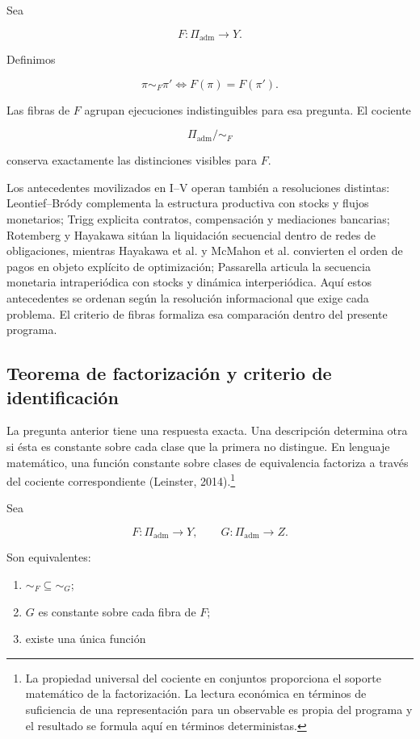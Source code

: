 \documentclass[10pt,a5paper,twoside]{article}
\providecommand{\tightlist}{\setlength{\itemsep}{0pt}\setlength{\parskip}{0pt}}
\begin{document}
Sea

\[
F:\Pi_{\mathrm{adm}}\to Y.
\]

Definimos

\[
\pi\sim_F\pi'
\iff
F(\pi)=F(\pi').
\]

Las fibras de \(F\) agrupan ejecuciones indistinguibles para esa
pregunta. El cociente

\[
\Pi_{\mathrm{adm}}/\sim_F
\]

conserva exactamente las distinciones visibles para \(F\).

Los antecedentes movilizados en I--V operan también a resoluciones
distintas: Leontief--Bródy complementa la estructura productiva con stocks
y flujos monetarios; Trigg explicita contratos, compensación y mediaciones
bancarias; Rotemberg y Hayakawa sitúan la liquidación secuencial dentro de
redes de obligaciones, mientras Hayakawa et al. y McMahon et al. convierten el
orden de pagos en objeto explícito de optimización; Passarella articula la
secuencia monetaria intraperiódica con stocks y dinámica interperiódica.
Aquí estos antecedentes se ordenan según la resolución informacional que
exige cada problema. El criterio de fibras formaliza esa comparación dentro
del presente programa.

\subsection{Teorema de factorización y criterio de identificación}\label{teorema-de-factorizaciuxf3n-y-criterio-de-identificaciuxf3n}

La pregunta anterior tiene una respuesta exacta. Una descripción determina
otra si ésta es constante sobre cada clase que la primera no distingue. En
lenguaje matemático, una función constante sobre clases de equivalencia
factoriza a través del cociente correspondiente (Leinster, 2014).\footnote{La propiedad universal del
  cociente en conjuntos proporciona el soporte matemático de la
  factorización. La lectura económica en términos de suficiencia de una
  representación para un observable es propia del programa y el resultado
  se formula aquí en términos deterministas.}

Sea

\[
F:\Pi_{\mathrm{adm}}\to Y,
\qquad
G:\Pi_{\mathrm{adm}}\to Z.
\]

Son equivalentes:

\begin{enumerate}
\def\labelenumi{\arabic{enumi}.}
\tightlist
\item
  \(\sim_F\subseteq\sim_G\);
\item
  \(G\) es constante sobre cada fibra de \(F\);
\item
  existe una única función
\end{enumerate}
\end{document}
